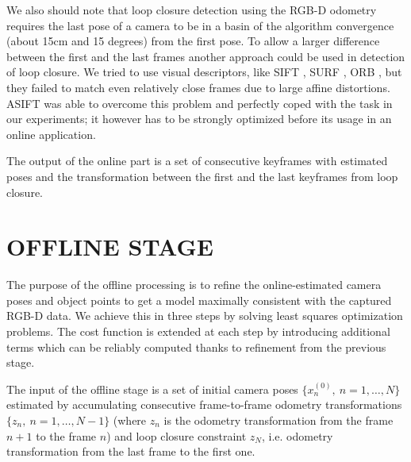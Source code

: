 \documentclass[letterpaper, 10 pt, conference]{ieeeconf}  %
\begin{document}
We also should note that loop closure detection using the RGB-D odometry requires
the last pose of a camera to be in a basin of
the algorithm convergence (about 15cm and 15 degrees) from the first pose. 
To allow a larger difference between the first and the last frames
another approach could be used in detection of loop closure. We tried to use visual descriptors, like
SIFT \cite{lowe2004distinctive}, SURF \cite{bay2006surf}, ORB \cite{rublee2011orb}, but they failed to match even
relatively close frames due to large affine distortions.
ASIFT \cite{morel2009asift} was able to overcome this problem
and perfectly coped with the task in our experiments;
it however has to be strongly optimized before its usage in an online application.

The output of the online part is a set of consecutive keyframes with 
estimated poses and the transformation between the first and the last 
keyframes from loop closure.


\section{OFFLINE STAGE}

\label{sec:offline}

The purpose of the offline processing is to refine the online-estimated 
camera poses and object points to get a model maximally 
consistent with the captured RGB-D data. We achieve this in three steps by 
solving least squares optimization problems. The cost function is extended at each step 
by introducing additional terms which can be reliably computed
thanks to refinement from the previous stage.


The input of the offline stage is a set of initial camera poses $\{x_n^{(0)},~n=1,\dots, N\}$ 
estimated by accumulating consecutive frame-to-frame odometry transformations 
$\{z_n,~n=1,\dots, N-1\}$  
(where $z_n$ is the odometry transformation from the frame $n+1$ to the frame $n$)
and loop closure constraint $z_{N}$, 
i.e. odometry transformation from the last frame to the first one.
\end{document}

